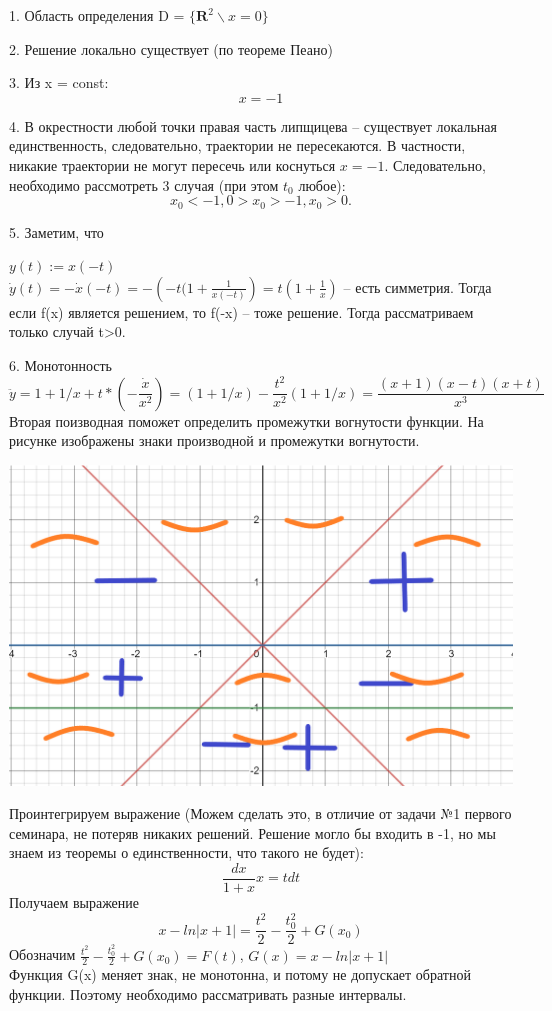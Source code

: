 \documentclass[10pt]{report}
\begin{document}
1. Область определения D = $\{ \textbf {R}^2 \backslash x=0\}$

2. Решение локально существует (по теореме Пеано)

3. Из x = const: 
\[
x = -1
\]

4.  В  окрестности любой точки правая часть липщицева -- существует локальная единственность, следовательно, траектории не пересекаются. В частности, никакие траектории не могут пересечь или коснуться $x=-1$. Следовательно, необходимо рассмотреть 3 случая (при этом $t_0$ любое): \[ x_0 < -1, 0> x_0 > -1, x_0 > 0.\]

5. Заметим, что

$y(t) := x(-t)$\\
$\dot{y}(t)=-\dot{x}(-t)=-\left(-t(1+\frac 1 {x(-t)} \right) = t\left(1+ \frac {1} {x}\right)$ -- есть симметрия. Тогда если f(x) является решением, то f(-x) -- тоже решение. Тогда рассматриваем только случай t>0. 

6. Монотонность\\
\[
\ddot{y} = 1+1/x + t*\left(- \frac {\dot{x}} {x^2}\right)=(1+1/x)- \frac {t^2} {x^2} (1+1/x)= \frac {(x+1)(x-t)(x+t)} {x^3}
\]
Вторая поизводная поможет определить промежутки вогнутости функции. 
На рисунке изображены знаки производной и промежутки вогнутости.
\begin{center}
{\includegraphics[scale=0.45]{graph2.2.png}} 
\end{center}

Проинтегрируем выражение (Можем сделать это, в отличие от задачи №1 первого семинара, не потеряв никаких решений. Решение могло бы входить в -1, но мы знаем из теоремы о единственности, что такого не будет):
\[
\frac {dx} {1+x} x = tdt 
\]
Получаем выражение
\[
x-ln|x+1| = \frac {t^2} 2 - \frac {t_0^2} 2 +G(x_0)
\]
Обозначим  $\frac {t^2} 2- \frac {t_0^2} 2 +G(x_0) = F(t)$, $G(x)=x-ln|x+1|$ \\
Функция G(x) меняет знак, не монотонна, и потому не допускает обратной функции. Поэтому необходимо рассматривать разные интервалы.\\
\end{document}
